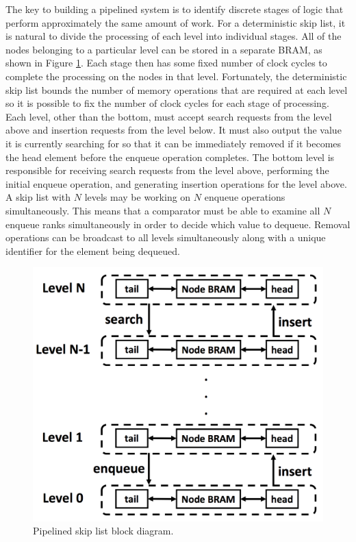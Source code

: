 The key to building a pipelined system is to identify discrete stages of logic that perform approximately the same amount of work. For a deterministic skip list, it is natural to divide the processing of each level into individual stages. All of the nodes belonging to a particular level can be stored in a separate BRAM, as shown in Figure \ref{fig:pipe-skip-list}. Each stage then has some fixed number of clock cycles to complete the processing on the nodes in that level. Fortunately, the deterministic skip list bounds the number of memory operations that are required at each level so it is possible to fix the number of clock cycles for each stage of processing. Each level, other than the bottom, must accept search requests from the level above and insertion requests from the level below. It must also output the value it is currently searching for so that it can be immediately removed if it becomes the head element before the enqueue operation completes. The bottom level is responsible for receiving search requests from the level above, performing the initial enqueue operation, and generating insertion operations for the level above. A skip list with $N$ levels may be working on $N$ enqueue operations simultaneously. This means that a comparator must be able to examine all $N$ enqueue ranks simultaneously in order to decide which value to dequeue. Removal operations can be broadcast to all levels simultaneously along with a unique identifier for the element being dequeued.

\begin{figure}[!h]
\includegraphics[width=0.8\linewidth]{figures/design/pipe-skip-list}
\caption{Pipelined skip list block diagram.}
\label{fig:pipe-skip-list}
\end{figure}


